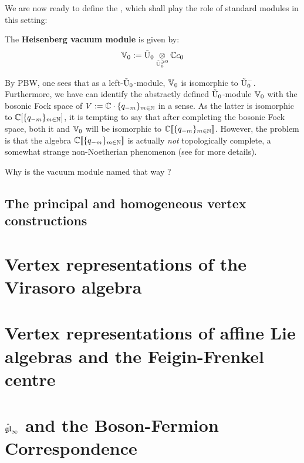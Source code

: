             We are now ready to define the , which shall play the role of standard modules in this setting:
            \begin{definition} \label{def: heisenberg_vacuum_module}
                The \textbf{Heisenberg vacuum module} is given by:
                    $$\V_0 := \tilde{\rmU}_0 \tensor_{\tilde{\rmU}_0^{\geq 0}} \bbC c_0$$
            \end{definition}
            By PBW, one sees that as a left-$\tilde{\mathrm{U}}_0$-module, $\mathbb{V}_0$ is isomorphic to $\tilde{\mathrm{U}}_0^-$. Furthermore, we have can identify the abstractly defined $\tilde{\mathrm{U}}_0$-module $\mathbb{V}_0$ with the bosonic Fock space of $V := \mathbb{C} \cdot \{q_{-m}\}_{m \in \mathbb{N}}$ in a sense. As the latter is isomorphic to $\mathbb{C}[\{q_{-m}\}_{m \in \mathbb{N}}]$, it is tempting to say that after completing the bosonic Fock space, both it and $\mathbb{V}_0$ will be isomorphic to $\mathbb{C}[\![  \{q_{-m}\}_{m \in \mathbb{N}} ]\!]$. However, the problem is that the algebra $\mathbb{C}[\![  \{q_{-m}\}_{m \in \mathbb{N}} ]\!]$ is actually \textit{not} topologically complete, a somewhat strange non-Noetherian phenomenon (see \cite[\href{https://stacks.math.columbia.edu/tag/05JA}{Tag 05JA}]{stacks} for more details).  
            \begin{remark}
                Why is the vacuum module named that way ? 
            \end{remark}
    
        \subsection{The principal and homogeneous vertex constructions}

    \section{Vertex representations of the Virasoro algebra}

    \section{Vertex representations of affine Lie algebras and the Feigin-Frenkel centre}

    \section{\texorpdfstring{$\hat{\mathfrak{gl}}_{\infty}$}{} and the Boson-Fermion Correspondence} 
    
    \printbibliography

